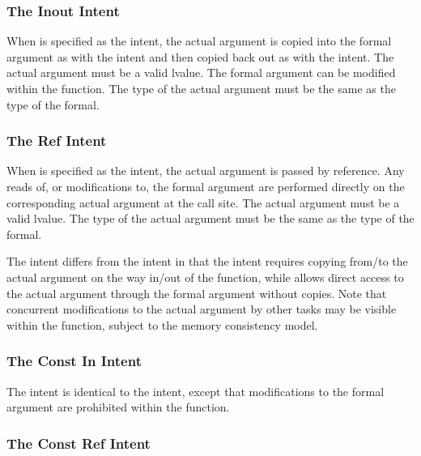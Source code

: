 \subsubsection{The Inout Intent}
\label{The_Inout_Intent}

When  is specified as the intent, the actual argument is
copied into the formal argument as with the  intent and then
copied back out as with the  intent.  The actual argument
must be a valid lvalue.  The formal argument can be modified within
the function.
The type of the actual argument must be the same
as the type of the formal.


\subsubsection{The Ref Intent}
\label{The_Ref_Intent}

When  is specified as the intent, the actual argument is
passed by reference.  Any reads of, or modifications to, the formal
argument are performed directly on the corresponding actual argument
at the call site.  The actual argument must be a valid lvalue.
The type of the actual argument must be the same
as the type of the formal.

The  intent differs from the  intent in that
the  intent requires copying from/to the actual argument on
the way in/out of the function, while  allows direct
access to the actual argument through the formal argument without
copies.  Note that concurrent modifications to the  actual argument by
other tasks may be visible within the function, subject to the memory
consistency model.


\subsubsection{The Const In Intent}
\label{The_Const_In_Intent}

The  intent is identical to the  intent,
except that modifications to the formal argument are prohibited within
the function.


\subsubsection{The Const Ref Intent}
\label{The_Const_Ref_Intent}

